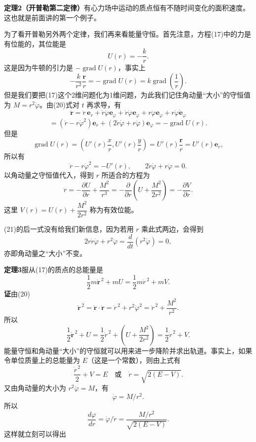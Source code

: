 \noindent\textbf{定理2（开普勒第二定律）}\quad 有心力场中运动的质点恒有不随时间变化的面积速度。这也就是前面讲的第一个例子。

为了看开普勒另外两个定律，我们再来看能量守恒。首先注意，方程(17)中的力是有位能的，其位能是
\[
 U(r)=-\frac{k}{r}.
\]
这是因为牛顿的引力是 $-\operatorname{grad}U(r)$，事实上
\[
 -\frac{k}{r^2}\frac{\boldsymbol r}{r}=-\operatorname{grad}U(r)
 =k\operatorname{grad}\left(\frac1r\right).
\]
但是我们要把(17)这个2维问题化为1维问题，为此我们记住角动量“大小”的守恒值为 $M=r^2\dot\varphi$。由(20)式对 $t$ 再求导，有
\[
 \ddot{\boldsymbol r}=\ddot r\,\boldsymbol e_r+\dot r\dot\varphi\boldsymbol e_\varphi
 +\dot r\dot\varphi\boldsymbol e_\varphi+r\ddot\varphi\boldsymbol e_\varphi+r\dot\varphi\dot{\boldsymbol e}_\varphi
\]
\[
 =\left(\ddot r-r\dot\varphi^2\right)\boldsymbol e_r
 +\left(2\dot r\dot\varphi+r\ddot\varphi\right)\boldsymbol e_\varphi
 =-\operatorname{grad}U(r).
\]
但是
\[
 \operatorname{grad}U(r)=\left(U'(r)\frac{x}{r},U'(r)\frac{y}{r}\right)
 =U'(r)\frac{\boldsymbol r}{r}=U'(r)\boldsymbol e_r,
\]
所以有
\begin{equation}
 \ddot r-r\dot\varphi^2=-U'(r),\qquad 2\dot r\dot\varphi+r\ddot\varphi=0.
 \tag{21}
\end{equation}
以角动量之守恒值代入，得到 $r$ 所适合的方程为
\[
 \ddot r=-\frac{\partial U}{\partial r}+\frac{M^2}{r^3}
 =-\frac{\partial}{\partial r}\left(U+\frac{M^2}{2r^2}\right)
 =-\frac{\partial V}{\partial r}.
\]
这里 $V(r)=U(r)+\dfrac{M^2}{2r^2}$ 称为有效位能。

(21)的后一式没有给我们新信息，因为若用 $r$ 乘此式两边，会得到
\[
 2r\dot r\dot\varphi+r^2\ddot\varphi=\frac{d}{dt}(r^2\dot\varphi)=0,
\]
亦即角动量之“大小”不变。

\noindent\textbf{定理3}\quad 服从(17)的质点的总能量是
\[
 \frac12m\dot{\boldsymbol r}^{\,2}+mU=\frac12m\dot r^{\,2}+mV.
\]
\noindent\textbf{证}\quad 由(20)
\[
 \dot{\boldsymbol r}^{\,2}=\dot{\boldsymbol r}\cdot\dot{\boldsymbol r}
 =\dot r^{\,2}+r^2\dot\varphi^2
 =\dot r^{\,2}+\frac{M^2}{r^2}.
\]
所以
\[
 \frac12\dot{\boldsymbol r}^{\,2}+U
 =\frac12\dot r^{\,2}+\left(U+\frac{M^2}{2r^2}\right)
 =\frac12\dot r^{\,2}+V.
\]
能量守恒和角动量“大小”的守恒就可以用来进一步降阶并求出轨道。事实上，如果令单位质量上的总能量为 $E$（这是一个常数），则由上式有
\[
 \frac{\dot r^{\,2}}2+V=E\quad\text{或}\quad \dot r=\sqrt{2(E-V)}.
\]
又由角动量的大小为 $r^2\dot\varphi=M$，有
\[
 \dot\varphi=M/r^2.
\]
所以
\begin{equation}
 \frac{d\varphi}{dr}=\dot\varphi/\dot r=\frac{M/r^2}{\sqrt{2(E-V)}}.
 \tag{22}
\end{equation}
这样就立刻可以得出


